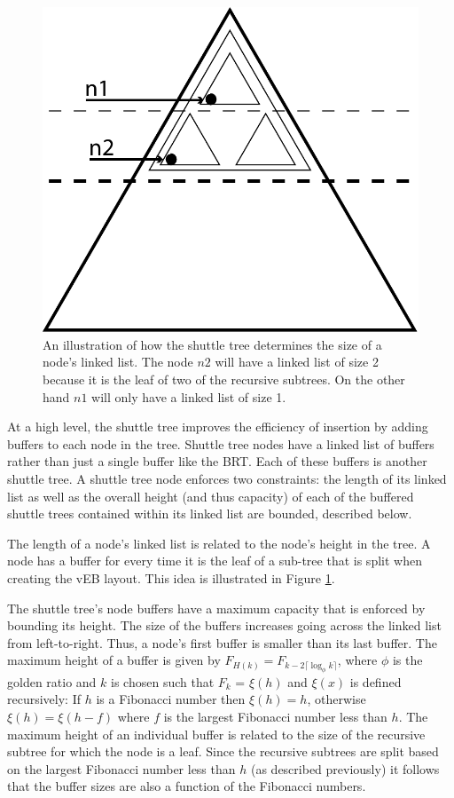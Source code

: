 \documentclass[preprint]{style}
\begin{document}
\begin{figure}

\begin{center}
	\includegraphics[width=0.8\columnwidth]{figures/buffers.pdf}
\end{center}

\caption{An illustration of how the shuttle tree determines the size of a node's linked list. The 
node $n2$ will have a linked list of size 2 because it is the leaf of two of the recursive subtrees. 
On the other hand $n1$ will only have a linked list of size 1.}
\label{fig:buffers}
\end{figure}


At a high level, the shuttle tree improves the efficiency of insertion by
adding buffers to each node in the tree. Shuttle tree nodes have a
linked list of buffers rather than just a single buffer like the BRT. Each of
these buffers is another shuttle tree. A shuttle tree node enforces two
constraints: the length of its linked list as well as the overall height (and
thus capacity) of each of the buffered shuttle trees contained within its
linked list are bounded, described below.

The length of a node's linked list is related to the node's height in the tree.
A node has a buffer for every time it is the leaf of a sub-tree that is split
when creating the vEB layout. This idea is illustrated in Figure
\ref{fig:buffers}.

The shuttle tree's node buffers have a maximum capacity that is enforced by
bounding its height. The size of the buffers increases going across the linked
list from left-to-right. Thus, a node's first buffer is smaller than its last
buffer. The maximum height of a buffer is given by $F_{H(k)} = F_{k-2 \lceil
\log_{\phi} k \rceil}$, where $\phi$ is the golden ratio and $k$ is chosen such
that $F_k$ = $\xi(h)$ and $\xi(x)$ is defined recursively: If $h$ is a
Fibonacci number then $\xi(h) = h$, otherwise $\xi(h) = \xi(h-f)$ where $f$ is
the largest Fibonacci number less than $h$. The maximum height of an individual
buffer is related to the size of the recursive subtree for which the node is a
leaf.  Since the recursive subtrees are split based on the largest Fibonacci
number less than $h$ (as described previously) it follows that the buffer sizes
are also a function of the Fibonacci numbers.
\end{document}
